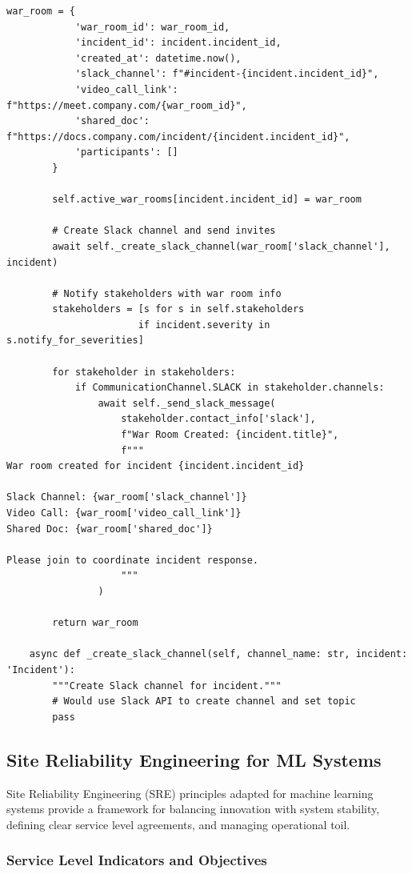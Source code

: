 \begin{lstlisting}[style=python, caption={Incident communication with multi-channel notifications}]
        war_room = {
            'war_room_id': war_room_id,
            'incident_id': incident.incident_id,
            'created_at': datetime.now(),
            'slack_channel': f"#incident-{incident.incident_id}",
            'video_call_link': f"https://meet.company.com/{war_room_id}",
            'shared_doc': f"https://docs.company.com/incident/{incident.incident_id}",
            'participants': []
        }

        self.active_war_rooms[incident.incident_id] = war_room

        # Create Slack channel and send invites
        await self._create_slack_channel(war_room['slack_channel'], incident)

        # Notify stakeholders with war room info
        stakeholders = [s for s in self.stakeholders
                       if incident.severity in s.notify_for_severities]

        for stakeholder in stakeholders:
            if CommunicationChannel.SLACK in stakeholder.channels:
                await self._send_slack_message(
                    stakeholder.contact_info['slack'],
                    f"War Room Created: {incident.title}",
                    f"""
War room created for incident {incident.incident_id}

Slack Channel: {war_room['slack_channel']}
Video Call: {war_room['video_call_link']}
Shared Doc: {war_room['shared_doc']}

Please join to coordinate incident response.
                    """
                )

        return war_room

    async def _create_slack_channel(self, channel_name: str, incident: 'Incident'):
        """Create Slack channel for incident."""
        # Would use Slack API to create channel and set topic
        pass
\end{lstlisting}

\subsection{Site Reliability Engineering for ML Systems}

Site Reliability Engineering (SRE) principles adapted for machine learning systems provide a framework for balancing innovation with system stability, defining clear service level agreements, and managing operational toil.

\subsubsection{Service Level Indicators and Objectives}

